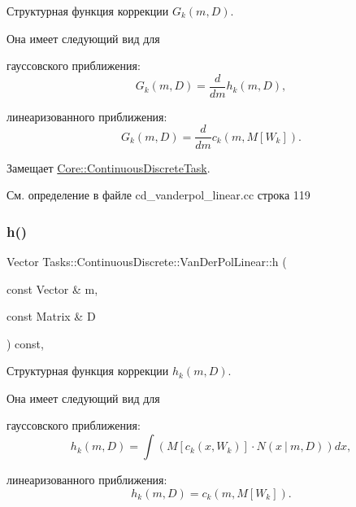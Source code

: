 Структурная функция коррекции $G_k(m, D)$. 

Она имеет следующий вид для


\begin{DoxyItemize}
\item гауссовского приближения\+: \[G_k(m, D) = \frac{d}{dm}h_k(m,D),\]
\item линеаризованного приближения\+: \[G_k(m, D) = \frac{d}{dm}c_k(m,M[W_k]).\] 
\end{DoxyItemize}

Замещает \hyperlink{class_core_1_1_continuous_discrete_task_a2bc6d34d112ec0999857f7f9e0f67dda}{Core\+::\+Continuous\+Discrete\+Task}.



См. определение в файле cd\+\_\+vanderpol\+\_\+linear.\+cc строка 119

\hypertarget{class_tasks_1_1_continuous_discrete_1_1_van_der_pol_linear_a2a3ca4ebc2e8c458fbea40e854f375ec}{}\label{class_tasks_1_1_continuous_discrete_1_1_van_der_pol_linear_a2a3ca4ebc2e8c458fbea40e854f375ec} 
\subsubsection{\texorpdfstring{h()}{h()}}
{\footnotesize\ttfamily Vector Tasks\+::\+Continuous\+Discrete\+::\+Van\+Der\+Pol\+Linear\+::h (\begin{DoxyParamCaption}\item[{const Vector \&}]{m,  }\item[{const Matrix \&}]{D }\end{DoxyParamCaption}) const\hspace{0.3cm}{\ttfamily [override]}, {\ttfamily [virtual]}}



Структурная функция коррекции $h_k(m, D)$. 

Она имеет следующий вид для


\begin{DoxyItemize}
\item гауссовского приближения\+: \[h_k(m, D) = \int (M[c_k(x, W_k)] \cdot N(x\ |\ m, D))dx,\]
\item линеаризованного приближения\+: \[h_k(m, D) = c_k(m, M[W_k]).\] 
\end{DoxyItemize}

